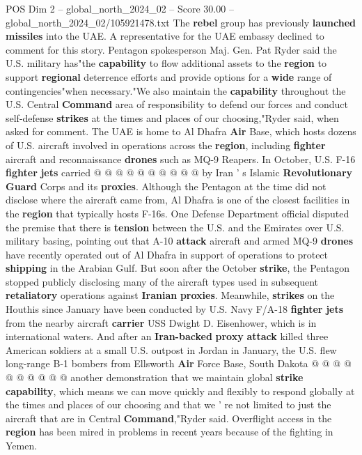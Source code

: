 \begin{textsample}{POS Dim 2 – global\_north\_2024\_02 – Score 30.00 – global\_north\_2024\_02/105921478.txt}
The \textbf{rebel} group has previously \textbf{launched} \textbf{missiles} into the UAE.
A representative for the UAE embassy declined to comment for this story.
Pentagon spokesperson Maj.
Gen.
Pat Ryder said the U.S. military has"the \textbf{capability} to flow additional assets to the \textbf{region} to support \textbf{regional} deterrence efforts and provide options for a \textbf{wide} range of contingencies"when necessary."We also maintain the \textbf{capability} throughout the U.S.
Central \textbf{Command} area of responsibility to defend our forces and conduct self-defense \textbf{strikes} at the times and places of our choosing,"Ryder said, when asked for comment.
The UAE is home to Al Dhafra \textbf{Air} Base, which hosts dozens of U.S. aircraft involved in operations across the \textbf{region}, including \textbf{fighter} aircraft and reconnaissance \textbf{drones} such as MQ-9 Reapers.
In October, U.S.
F-16 \textbf{fighter} \textbf{jets} carried @ @ @ @ @ @ @ @ @ @ by Iran ' s Islamic \textbf{Revolutionary} \textbf{Guard} Corps and its \textbf{proxies}.
Although the Pentagon at the time did not disclose where the aircraft came from, Al Dhafra is one of the closest facilities in the \textbf{region} that typically hosts F-16s.
One Defense Department official disputed the premise that there is \textbf{tension} between the U.S. and the Emirates over U.S. military basing, pointing out that A-10 \textbf{attack} aircraft and armed MQ-9 \textbf{drones} have recently operated out of Al Dhafra in support of operations to protect \textbf{shipping} in the Arabian Gulf.
But soon after the October \textbf{strike}, the Pentagon stopped publicly disclosing many of the aircraft types used in subsequent \textbf{retaliatory} operations against \textbf{Iranian} \textbf{proxies}.
Meanwhile, \textbf{strikes} on the Houthis since January have been conducted by U.S.
Navy F/A-18 \textbf{fighter} \textbf{jets} from the nearby aircraft \textbf{carrier} USS Dwight D.
Eisenhower, which is in international waters.
And after an \textbf{Iran-backed} \textbf{proxy} \textbf{attack} killed three American soldiers at a small U.S. outpost in Jordan in January, the U.S. flew long-range B-1 bombers from Ellsworth \textbf{Air} Force Base, South Dakota @ @ @ @ @ @ @ @ @ @ another demonstration that we maintain global \textbf{strike} \textbf{capability}, which means we can move quickly and flexibly to respond globally at the times and places of our choosing and that we ' re not limited to just the aircraft that are in Central \textbf{Command},"Ryder said.
Overflight access in the \textbf{region} has been mired in problems in recent years because of the fighting in Yemen.

\end{textsample}
